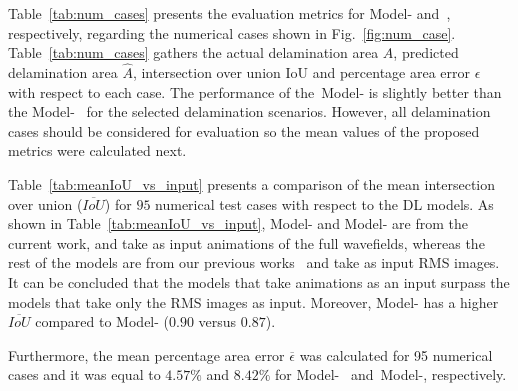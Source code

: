 \begin{sloppypar}
	Table~\ref{tab:num_cases} presents the evaluation metrics for Model- and~, respectively, regarding the numerical cases shown in Fig.~\ref{fig:num_case}.
	Table~\ref{tab:num_cases} gathers the actual delamination area \(A\), predicted delamination area \(\hat{A}\), intersection over union IoU and percentage area error \(\epsilon\) with respect to each case. 
	The performance of the~Model- is slightly better than the Model-~ for the selected delamination scenarios.
	However, all delamination cases should be considered for evaluation so the mean values of the proposed metrics were calculated next.
	
	Table~\ref{tab:meanIoU_vs_input} presents a comparison of the mean intersection over union (\(\overline{IoU}\)) for \(95\) numerical test cases with respect to the DL models.
	As shown in Table~\ref{tab:meanIoU_vs_input}, Model- and Model- are from the current work, and take as input animations of the full wavefields, whereas the rest of the models are from our previous works~\cite{Ijjeh2021, Ijjeh2022} and take as input RMS images.
	It can be concluded that the models that take animations as an input surpass the models that take only the RMS images as input. 
	Moreover, Model- has a higher \(\overline{IoU}\) compared to Model- (\(0.90\) versus \(0.87\)).
	
	Furthermore, the mean percentage area error \(\overline{\epsilon}\) was calculated for 95 numerical cases and it was equal to \(4.57 \%\) and \(8.42\%\) for Model-~ and~Model-, respectively.
	

\end{sloppypar}
